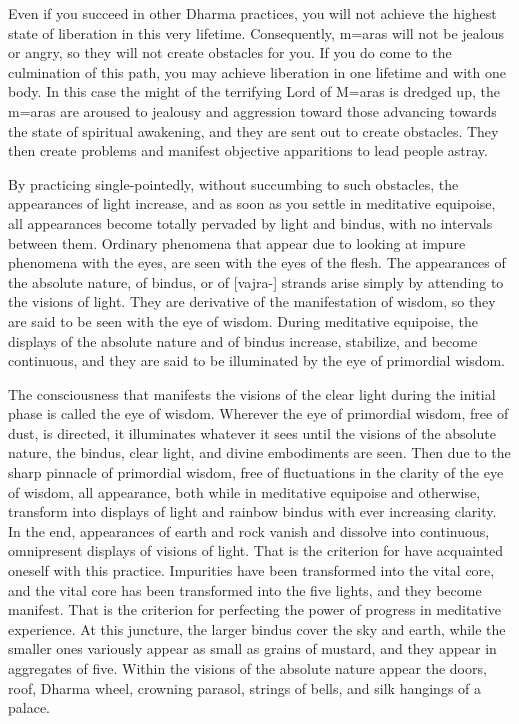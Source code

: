 \documentclass[11pt,twocolumn]{article}
\begin{document}
Even if you succeed in other Dharma practices, you will not achieve
the highest state of liberation in this very lifetime. Consequently,
m\a={a}ras will not be jealous or angry, so they will not create
obstacles for you. If you do come to the culmination of this path, you
may achieve liberation in one lifetime and with one body. In this case
the might of the terrifying Lord of M\a={a}ras is dredged up, the
m\a={a}ras are aroused to jealousy and aggression toward those
advancing towards the state of spiritual awakening, and they are sent
out to create obstacles. They then create problems and manifest
objective apparitions to lead people astray.

By practicing single\hyp{}pointedly, without succumbing to such
obstacles, the appearances of light increase, and as soon as you
settle in meditative equipoise, all appearances become totally
pervaded by light and bindus, with no intervals between them. Ordinary
phenomena that appear due to looking at impure phenomena with the
eyes, are seen with the eyes of the flesh. The appearances of the
absolute nature, of bindus, or of [vajra\hyp{}] strands arise simply
by attending to the visions of light. They are derivative of the
manifestation of wisdom, so they are said to be seen with the eye of
wisdom. During meditative equipoise, the displays of the absolute
nature and of bindus increase, stabilize, and become continuous, and
they are said to be illuminated by the eye of primordial wisdom.

The consciousness that manifests the visions of the clear light during
the initial phase is called the eye of wisdom. Wherever the eye of
primordial wisdom, free of dust, is directed, it illuminates whatever
it sees until the visions of the absolute nature, the bindus, clear
light, and divine embodiments are seen. Then due to the sharp pinnacle
of primordial wisdom, free of fluctuations in the clarity of the eye
of wisdom, all appearance, both while in meditative equipoise and
otherwise, transform into displays of light and rainbow bindus with
ever increasing clarity. In the end, appearances of earth and rock
vanish and dissolve into continuous, omnipresent displays of visions
of light. That is the criterion for have acquainted oneself with this
practice. Impurities have been transformed into the vital core, and
the vital core has been transformed into the five lights, and they
become manifest. That is the criterion for perfecting the power of
progress in meditative experience. At this juncture, the larger bindus
cover the sky and earth, while the smaller ones variously appear as
small as grains of mustard, and they appear in aggregates of
five. Within the visions of the absolute nature appear the doors,
roof, Dharma wheel, crowning parasol, strings of bells, and silk
hangings of a palace.
\end{document}
